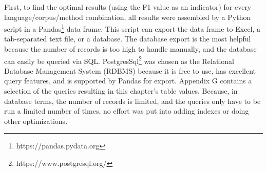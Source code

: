 First, to find the optimal results (using the F1 value as an indicator) for every language/corpus/method combination, all results were assembled by a Python script in a Pandas\footnote{https://pandas.pydata.org} data frame. This script can export the data frame to Excel, a tab-separated text file, or a database. The database export is the most helpful because the number of records is too high to handle manually, and the database can easily be queried via SQL. PostgresSql\footnote{https://www.postgresql.org/} was chosen as the Relational Database Management System (RDBMS) because it is free to use, has excellent query features, and is supported by Pandas for export. Appendix G contains a selection of the queries resulting in this chapter's table values. Because, in database terms, the number of records is limited, and the queries only have to be run a limited number of times, no effort was put into adding indexes or doing other optimizations.\\

